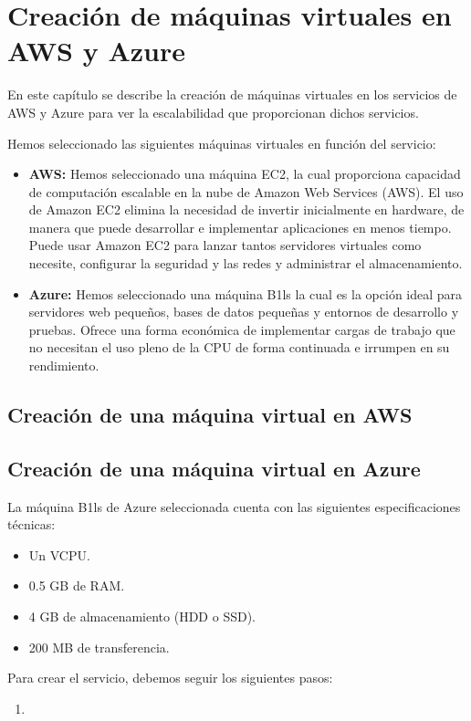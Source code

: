\chapter{Creación de máquinas virtuales en AWS y Azure}
En este capítulo se describe la creación de máquinas virtuales en los servicios de AWS y Azure para ver la escalabilidad que proporcionan dichos servicios.

Hemos seleccionado las siguientes máquinas virtuales en función del servicio:
\begin{itemize}
	\item \textbf{AWS:} Hemos seleccionado una máquina EC2, la cual proporciona capacidad de computación escalable en la nube de Amazon Web Services (AWS). El uso de Amazon EC2 elimina la necesidad de invertir inicialmente en hardware, de manera que puede desarrollar e implementar aplicaciones en menos tiempo. Puede usar Amazon EC2 para lanzar tantos servidores virtuales como necesite, configurar la seguridad y las redes y administrar el almacenamiento.
	\item \textbf{Azure:} Hemos seleccionado una máquina B1ls la cual es la opción ideal para servidores web pequeños, bases de datos pequeñas y entornos de desarrollo y pruebas. Ofrece una forma económica de implementar cargas de trabajo que no necesitan el uso pleno de la CPU de forma continuada e irrumpen en su rendimiento.
\end{itemize}
\section{Creación de una máquina virtual en AWS}


\section{Creación de una máquina virtual en Azure}
La máquina B1ls de Azure seleccionada cuenta con las siguientes especificaciones técnicas:
\begin{itemize}
	\item Un VCPU.
	\item 0.5 GB de RAM.
	\item 4 GB de almacenamiento (HDD o SSD).
	\item 200 MB de transferencia.
\end{itemize}

Para crear el servicio, debemos seguir los siguientes pasos:
\begin{enumerate}
	\item 
\end{enumerate}